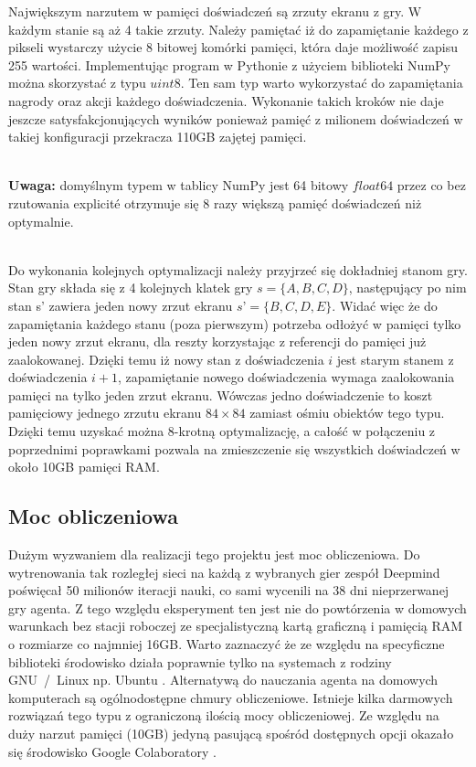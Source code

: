 \documentclass[12pt]{article}
\begin{document}
Największym narzutem w pamięci doświadczeń są zrzuty ekranu z gry. W każdym stanie są aż 4 takie zrzuty. Należy pamiętać iż do zapamiętanie każdego z pikseli wystarczy użycie 8 bitowej komórki pamięci, która daje możliwość zapisu 255 wartości. Implementując program w Pythonie z użyciem biblioteki NumPy można skorzystać z typu $uint8$. Ten sam typ warto wykorzystać do zapamiętania nagrody oraz akcji każdego doświadczenia. Wykonanie takich kroków nie daje jeszcze satysfakcjonujących wyników ponieważ pamięć z milionem doświadczeń w takiej konfiguracji przekracza 110GB zajętej pamięci.
\\\

 \textbf{Uwaga:} domyślnym typem w tablicy NumPy jest 64 bitowy $float64$ przez co bez rzutowania explicité otrzymuje się 8 razy większą pamięć doświadczeń niż optymalnie. 
\\\

Do wykonania kolejnych optymalizacji należy przyjrzeć się dokładniej stanom gry. Stan gry składa się z 4 kolejnych klatek gry $s=\{A, B, C, D\}$, następujący po nim stan s’ zawiera jeden nowy zrzut ekranu $s’=\{B, C, D, E\}$. Widać więc że do zapamiętania każdego stanu (poza pierwszym)  potrzeba odłożyć w pamięci tylko jeden nowy zrzut ekranu, dla reszty korzystając z referencji do pamięci już zaalokowanej. Dzięki temu iż nowy stan z doświadczenia $i$ jest starym stanem z doświadczenia $i+1$, zapamiętanie nowego doświadczenia wymaga zaalokowania pamięci na tylko jeden zrzut ekranu. Wówczas jedno doświadczenie to koszt pamięciowy jednego zrzutu ekranu $84\times84$ zamiast ośmiu obiektów tego typu. Dzięki temu uzyskać można 8-krotną optymalizację, a całość w połączeniu z poprzednimi poprawkami pozwala na zmieszczenie się wszystkich doświadczeń w około 10GB pamięci RAM.

\subsection{Moc obliczeniowa}
Dużym wyzwaniem dla realizacji tego projektu jest moc obliczeniowa. Do wytrenowania tak rozległej sieci na każdą z wybranych gier zespół Deepmind \cite{deepmind_2} poświęcał 50 milionów iteracji nauki, co sami wycenili na 38 dni nieprzerwanej gry agenta. Z tego względu eksperyment ten jest nie do powtórzenia w domowych warunkach bez stacji roboczej ze specjalistyczną kartą graficzną i pamięcią RAM o rozmiarze co najmniej 16GB. Warto zaznaczyć że ze względu na specyficzne biblioteki \cite{gym} środowisko działa poprawnie tylko na systemach z rodziny GNU~/~Linux np. Ubuntu \cite{ubuntu}.  Alternatywą do nauczania agenta na domowych komputerach są ogólnodostępne chmury obliczeniowe. Istnieje kilka darmowych rozwiązań tego typu z ograniczoną ilością mocy obliczeniowej. Ze względu na duży narzut pamięci (10GB) jedyną pasującą spośród dostępnych opcji okazało się środowisko Google Colaboratory \cite{colab}. 
\\\
\end{document}
